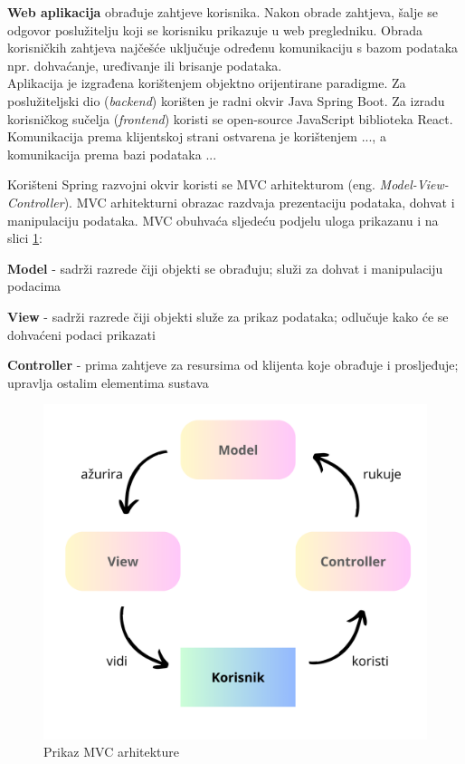 		\textbf{Web aplikacija} obrađuje zahtjeve korisnika. Nakon obrade zahtjeva, šalje se odgovor poslužitelju koji se korisniku prikazuje u web pregledniku. Obrada korisničkih zahtjeva najčešće uključuje određenu komunikaciju s bazom podataka npr. dohvaćanje, uređivanje ili brisanje podataka. \\
		
				
		Aplikacija je izgrađena korištenjem objektno orijentirane paradigme. Za poslužiteljski dio (\textit{backend}) korišten je radni okvir Java Spring Boot. Za izradu korisničkog sučelja (\textit{frontend}) koristi se open-source JavaScript biblioteka React. Komunikacija prema klijentskoj strani ostvarena je korištenjem ..., a komunikacija prema bazi podataka ...
		 
		\noindent Korišteni Spring razvojni okvir koristi se MVC arhitekturom (eng. \textit{Model-View-Controller}). MVC arhitekturni obrazac razdvaja prezentaciju podataka, dohvat i manipulaciju podataka. MVC obuhvaća sljedeću podjelu uloga prikazanu i na slici \ref{arh}:
		\begin{packed_item}
			\item \textbf{Model} - sadrži razrede čiji objekti se obrađuju; služi za dohvat i manipulaciju podacima
			\item \textbf{View} - sadrži razrede čiji objekti služe za prikaz podataka; odlučuje kako će se dohvaćeni podaci prikazati
			\item \textbf{Controller} - prima zahtjeve za resursima od klijenta koje
			obrađuje i prosljeđuje; upravlja ostalim elementima sustava
		\end{packed_item}
		
		
		\begin{figure}[H]
			\includegraphics[width=\textwidth]{slike/mvc-arh.PNG}
			\centering
			\caption{Prikaz MVC arhitekture}
			\label{arh}
		\end{figure}
		
